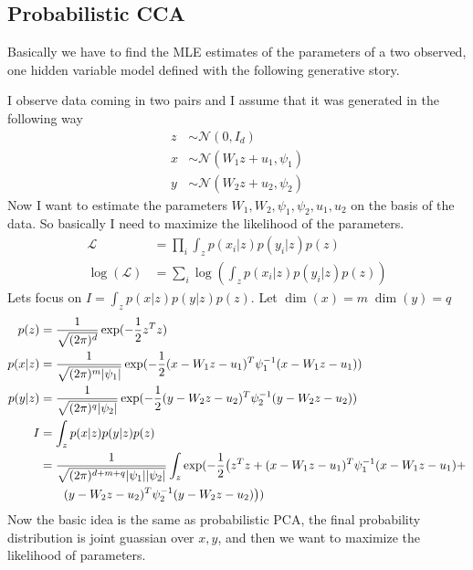\documentclass[11pt]{article}
\renewcommand{\det}[1]{|#1|}
\newcommand{\mf}{-\frac{1}{2}}
\begin{document}
\subsection{Probabilistic CCA}
Basically we have to find the MLE estimates of the parameters of a two
observed, one hidden variable model defined with the following
generative story. 

I observe data coming in two pairs and I assume that it was generated
in the following way
\begin{align}
  z &\sim \mathcal{N}(0, I_d)\\
  x &\sim \mathcal{N}(W_1z + u_1, \psi_1)\\
  y &\sim \mathcal{N}(W_2z + u_2, \psi_2)
\end{align}
Now I want to estimate the parameters $W_1, W_2, \psi_1, \psi_2,
u_1, u_2$ on the basis of the data. So basically I need to
maximize the likelihood of the parameters.
\begin{align}
  \mathcal{L} &= \prod_i \int_z p(x_i|z) p(y_i|z) p(z)\\
  \log(\mathcal{L}) &= \sum_i \log(\int_z p(x_i|z) p(y_i|z) p(z))
\end{align}
Lets focus on $I = \int_z p(x|z) p(y|z) p(z)$. Let $\dim(x)=m\; \dim(y)=q$
\begin{align}
  p(z)&= \frac{1}{\sqrt{(2\pi)^d}} \exp(\mf z^Tz)\\
  p(x|z)&= \frac{1}{\sqrt{(2\pi)^m\det{\psi_1}}}  \exp( \mf (x-W_1z-u_1)^T\psi_1^{-1}(x-W_1z-u_1))\\
  p(y|z)&= \frac{1}{\sqrt{(2\pi)^q\det{\psi_2}}}  \exp( \mf (y-W_2z-u_2)^T\psi_2^{-1}(y-W_2z-u_2))\\
  I &= \int_z p(x|z) p(y|z) p(z)\\
  &= \frac{1}{\sqrt{(2\pi)^{d+m+q} \det{\psi_1}\det{\psi_2} }}\int_z \exp(\mf
  \big( z^Tz + (x-W_1z-u_1)^T\psi_1^{-1}(x-W_1z-u_1) + \notag\\
  & \qquad (y-W_2z-u_2)^T\psi_2^{-1}(y-W_2z-u_2) \big) ) 
\end{align}
Now the basic idea is the same as probabilistic PCA, the final
probability distribution is joint guassian over $x, y$, and then we
want to maximize the likelihood of parameters.
\end{document}
